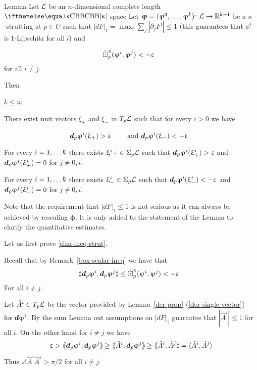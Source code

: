 \begin{thm}{Lemma}\label{lem-tight-diff-new}
Let $\mathcal{L}$  be an $n$-dimensional complete length $\Alex{\kappa}$ space
Let  $\bm\phi =(\phi^0,\ldots,\phi^\kay)\: \spc{L}\to\RR^{\kay+1}$ be a $\kappa$-strutting at $p\in U$ such that $|dF|_1=\max_i\sum_j|\partial _jF^i|\le 1$ 
(this guarantees that $\phi^i$ is $1$-Lipschitz for all $i$) and 

\[\tilde\boxdot^{\upkappa}_p({\upvarphi^i},{\upvarphi^j})<-\upvarepsilon\]
for all $i\not=j$.

Then 

\begin{subthm}{}\label{dim-ineq-strut}
 $k\le n$;
\end{subthm}


\begin{subthm}{}\label{incr-decr-all}
There exist unit vectors $\xi_+$ and $\xi_-$ in $T_p\mathcal{L}$ such that for every $i>0$ we have

\[
\bm{d}_p\upvarphi^i(\upxi_+)>\upvarepsilon\qquad \text{ and } \bm{d}_p\upvarphi^i(\upxi_-)<-\upvarepsilon
\]
\end{subthm}


\begin{subthm}{} \label{pos-eps}
 For every $i=1,\ldots \kay$ there exists $\xi^i+\in \Sigma_p\spc{L}$ such that $\bm{d}_p\upvarphi^i(\upxi^i_+)> \upvarepsilon$ and $\bm{d}_p\upvarphi^j(\upxi^i_+)=0$ for $j\ne 0, i$.
\end{subthm}
\begin{subthm}{} \label{neg-eps}
 For every $i=1,\ldots \kay$ there exists $\xi^i_-\in \Sigma_p\spc{L}$ such that $\bm{d}_p\upvarphi^i(\upxi^i_-) <- \upvarepsilon$ and $\bm{d}_p\upvarphi^j(\upxi^i_-)=0$ for $j\ne 0, i$.
\end{subthm}
\end{thm}
 Note that the requirement that $|dF|_1\le 1$ is not serious as it can always be achieved by rescaling $\bm{\phi}$. It is only added to the statement of the Lemma to clarify the quantitative estimates.
 
 
 Let us first prove \eqref{dim-ineq-strut}. 
 
  Recall that by Remark~\ref{box-scalar-ineq}  we have that 
 \[
\dlang \d_p\phi^i, \d_p\phi^j\drang\le \sdk\kappa{p}{\phi^i}{\phi^j}<-\eps
\]
For all $i\ne j$.

  Let $\hat A^i\in T_p\spc{L}$ be the vector provided by Lemma~\ref{der-prop} (\ref{der-single-vector}) for $\bm{d}\upvarphi^i$.  By the sum Lemma out assumptions on $|dF|_1$ guarantee that $|\hat A^i|\le 1$ for all $i$.
 On the other hand for $i\ne j$ we have 
 \[
 -\eps>\dlang \d_p\phi^i, \d_p\phi^j\drang\ge \dlang \hat A^i, \d_p\phi^j\drang\ge \dlang  \hat A^i, \hat A^j\drang=\langle  \hat A^i, \hat A^j\rangle
 \]
 Thus $\angle \hat A^i\hat A^j>\pi/2$ for all $i\ne j$.
 
